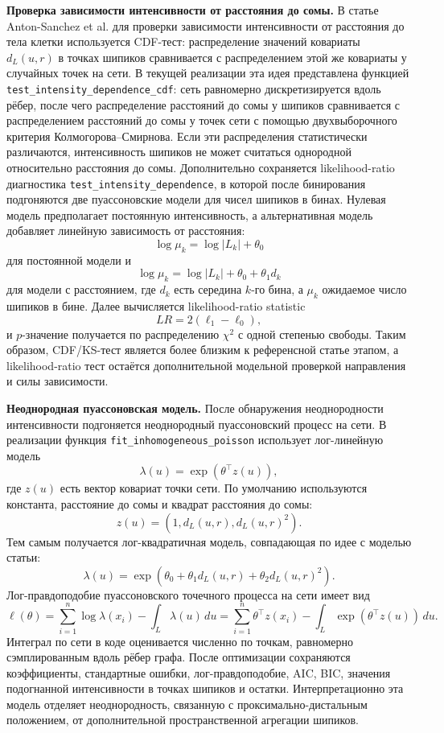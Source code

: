 \documentclass[12pt,a4paper]{article}
\begin{document}
\noindent\textbf{Проверка зависимости интенсивности от расстояния до сомы.}
В статье Anton-Sanchez et al. для проверки зависимости интенсивности от расстояния до тела клетки используется CDF-тест: распределение значений ковариаты \(d_L(u,r)\) в точках шипиков сравнивается с распределением этой же ковариаты у случайных точек на сети. В текущей реализации эта идея представлена функцией \texttt{test\_intensity\_dependence\_cdf}: сеть равномерно дискретизируется вдоль рёбер, после чего распределение расстояний до сомы у шипиков сравнивается с распределением расстояний до сомы у точек сети с помощью двухвыборочного критерия Колмогорова--Смирнова. Если эти распределения статистически различаются, интенсивность шипиков не может считаться однородной относительно расстояния до сомы. Дополнительно сохраняется likelihood-ratio диагностика \texttt{test\_intensity\_dependence}, в которой после бинирования подгоняются две пуассоновские модели для чисел шипиков в бинах. Нулевая модель предполагает постоянную интенсивность, а альтернативная модель добавляет линейную зависимость от расстояния:
\[
\log \mu_k = \log |L_k|+\theta_0
\]
для постоянной модели и
\[
\log \mu_k = \log |L_k|+\theta_0+\theta_1 d_k
\]
для модели с расстоянием, где \(d_k\) есть середина \(k\)-го бина, а \(\mu_k\) ожидаемое число шипиков в бине. Далее вычисляется likelihood-ratio statistic
\[
LR=2(\ell_1-\ell_0),
\]
и \(p\)-значение получается по распределению \(\chi^2\) с одной степенью свободы. Таким образом, CDF/KS-тест является более близким к референсной статье этапом, а likelihood-ratio тест остаётся дополнительной модельной проверкой направления и силы зависимости.

\noindent\textbf{Неоднородная пуассоновская модель.}
После обнаружения неоднородности интенсивности подгоняется неоднородный пуассоновский процесс на сети. В реализации функция \texttt{fit\_inhomogeneous\_poisson} использует лог-линейную модель
\[
\lambda(u)=\exp(\theta^\top z(u)),
\]
где \(z(u)\) есть вектор ковариат точки сети. По умолчанию используются константа, расстояние до сомы и квадрат расстояния до сомы:
\[
z(u)=\left(1,d_L(u,r),d_L(u,r)^2\right).
\]
Тем самым получается лог-квадратичная модель, совпадающая по идее с моделью статьи:
\[
\lambda(u)=\exp\left(\theta_0+\theta_1d_L(u,r)+\theta_2d_L(u,r)^2\right).
\]
Лог-правдоподобие пуассоновского точечного процесса на сети имеет вид
\[
\ell(\theta)=\sum_{i=1}^{n}\log\lambda(x_i)-\int_L \lambda(u)\,du
=
\sum_{i=1}^{n}\theta^\top z(x_i)-\int_L\exp(\theta^\top z(u))\,du.
\]
Интеграл по сети в коде оценивается численно по точкам, равномерно сэмплированным вдоль рёбер графа. После оптимизации сохраняются коэффициенты, стандартные ошибки, лог-правдоподобие, AIC, BIC, значения подогнанной интенсивности в точках шипиков и остатки. Интерпретационно эта модель отделяет неоднородность, связанную с проксимально-дистальным положением, от дополнительной пространственной агрегации шипиков.
\end{document}
